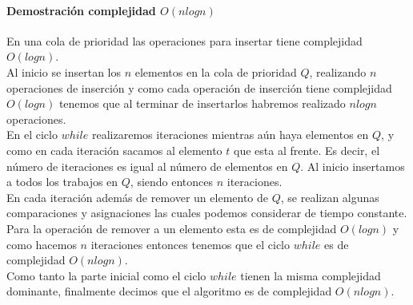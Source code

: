 \documentclass[12pt]{article}
\begin{document}
\paragraph{Demostración complejidad $O(nlogn)$}
En una cola de prioridad las operaciones para insertar tiene complejidad $O(logn)$.\\
Al inicio se insertan los $n$ elementos en la cola de prioridad $Q$, realizando $n$ operaciones de inserción y como cada operación de inserción tiene complejidad $O(logn)$ tenemos que al terminar de insertarlos habremos realizado $nlogn$ operaciones.\\
En el ciclo $while$ realizaremos iteraciones mientras aún haya elementos en $Q$, y como en cada iteración sacamos al elemento $t$ que esta al frente. Es decir, el número de iteraciones es igual al número de elementos en $Q$. Al inicio insertamos a todos los trabajos en $Q$, siendo entonces $n$ iteraciones.\\
En cada iteración además de remover un elemento de $Q$, se realizan  algunas comparaciones y asignaciones las cuales podemos considerar de tiempo constante. Para la operación de remover a un elemento esta es de complejidad $O(logn)$ y como hacemos $n$ iteraciones entonces tenemos que el ciclo $while$ es de complejidad $O(nlogn)$. \\
Como tanto la parte inicial como el ciclo $while$ tienen la misma complejidad dominante, finalmente decimos que el algoritmo es de complejidad $O(nlogn)$.\\
\end{document}
